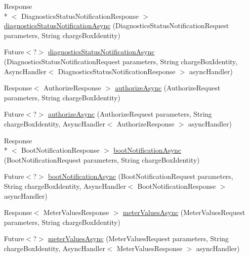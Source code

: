 \begin{DoxyCompactItemize}
\item 
Response\\*
$<$ Diagnostics\-Status\-Notification\-Response $>$ \hyperlink{classde_1_1rwth_1_1idsg_1_1steve_1_1ocpp_1_1soap_1_1_central_system_service15___soap_server_a6c319aa551d5a71f1debc3d916b792dc}{diagnostics\-Status\-Notification\-Async} (Diagnostics\-Status\-Notification\-Request parameters, String charge\-Box\-Identity)
\item 
Future$<$?$>$ \hyperlink{classde_1_1rwth_1_1idsg_1_1steve_1_1ocpp_1_1soap_1_1_central_system_service15___soap_server_a4de7571686733f68f9af9d4b62e88cd2}{diagnostics\-Status\-Notification\-Async} (Diagnostics\-Status\-Notification\-Request parameters, String charge\-Box\-Identity, Async\-Handler$<$ Diagnostics\-Status\-Notification\-Response $>$ async\-Handler)
\item 
Response$<$ Authorize\-Response $>$ \hyperlink{classde_1_1rwth_1_1idsg_1_1steve_1_1ocpp_1_1soap_1_1_central_system_service15___soap_server_a5a0b17fd3d80f21114f126edd6f2773f}{authorize\-Async} (Authorize\-Request parameters, String charge\-Box\-Identity)
\item 
Future$<$?$>$ \hyperlink{classde_1_1rwth_1_1idsg_1_1steve_1_1ocpp_1_1soap_1_1_central_system_service15___soap_server_a7912c78f9638a1dfdaa74eeba1c9583e}{authorize\-Async} (Authorize\-Request parameters, String charge\-Box\-Identity, Async\-Handler$<$ Authorize\-Response $>$ async\-Handler)
\item 
Response\\*
$<$ Boot\-Notification\-Response $>$ \hyperlink{classde_1_1rwth_1_1idsg_1_1steve_1_1ocpp_1_1soap_1_1_central_system_service15___soap_server_a9b3711eb8fbb26bbff5a6c9f6edb391b}{boot\-Notification\-Async} (Boot\-Notification\-Request parameters, String charge\-Box\-Identity)
\item 
Future$<$?$>$ \hyperlink{classde_1_1rwth_1_1idsg_1_1steve_1_1ocpp_1_1soap_1_1_central_system_service15___soap_server_aff0b3036d9edd67b43d302822a2dbe04}{boot\-Notification\-Async} (Boot\-Notification\-Request parameters, String charge\-Box\-Identity, Async\-Handler$<$ Boot\-Notification\-Response $>$ async\-Handler)
\item 
Response$<$ Meter\-Values\-Response $>$ \hyperlink{classde_1_1rwth_1_1idsg_1_1steve_1_1ocpp_1_1soap_1_1_central_system_service15___soap_server_a331e563815199b7a6c8afd678f1fcb4c}{meter\-Values\-Async} (Meter\-Values\-Request parameters, String charge\-Box\-Identity)
\item 
Future$<$?$>$ \hyperlink{classde_1_1rwth_1_1idsg_1_1steve_1_1ocpp_1_1soap_1_1_central_system_service15___soap_server_acde0357fd7e8f2c683d7b50be5142884}{meter\-Values\-Async} (Meter\-Values\-Request parameters, String charge\-Box\-Identity, Async\-Handler$<$ Meter\-Values\-Response $>$ async\-Handler)

\end{DoxyCompactItemize}
